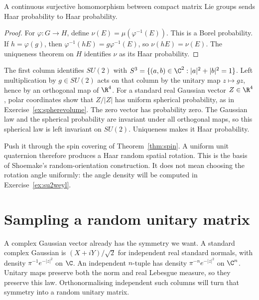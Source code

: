 \begin{corollary}\label{cor:pushhaar}
A continuous surjective homomorphism between compact matrix Lie groups
sends Haar probability to Haar probability.
\end{corollary}
\begin{proof}
For $\varphi:G\to H$, define $\nu(E)=\mu(\varphi^{-1}(E))$.
This is a Borel probability. If $h=\varphi(g)$, then
$\varphi^{-1}(hE)=g\varphi^{-1}(E)$, so $\nu(hE)=\nu(E)$.
The uniqueness theorem on $H$ identifies $\nu$ as its Haar probability.
\end{proof}

\begin{example}[$SU(2)$ and $SO(3)$]\label{ex:su2haar}
The first column identifies $SU(2)$ with
$S^3=\{(a,b)\in\C^2:|a|^2+|b|^2=1\}$.
Left multiplication by $g\in SU(2)$ acts on that column by the unitary
map $z\mapsto gz$, hence by an orthogonal map of $\R^4$.
For a standard real Gaussian vector $Z\in\R^4$, polar coordinates show
that $Z/|Z|$ has uniform spherical probability, as in
Exercise~\ref{ex:spherevolume}. The zero vector has probability zero.
The Gaussian law and the spherical probability are invariant under all
orthogonal maps, so this spherical law is left invariant on $SU(2)$.
Uniqueness makes it Haar probability.

Push it through the spin covering of Theorem~\ref{thm:spin}.
A uniform unit quaternion therefore produces a Haar random spatial
rotation. This is the basis of Shoemake's random-orientation construction.
It does not mean choosing the rotation angle uniformly: the angle density
will be computed in Exercise~\ref{ex:su2weyl}.
\end{example}

\section{Sampling a random unitary matrix}

A complex Gaussian vector already has the symmetry we want. A standard
complex Gaussian is $(X+iY)/\sqrt2$ for independent real standard normals,
with density $\pi^{-1}e^{-|z|^2}$ on $\C$.
An independent $n$-tuple has density $\pi^{-n}e^{-|z|^2}$ on $\C^n$.
Unitary maps preserve both the norm and real Lebesgue measure, so they
preserve this law. Orthonormalising independent such columns will turn
that symmetry into a random unitary matrix.

